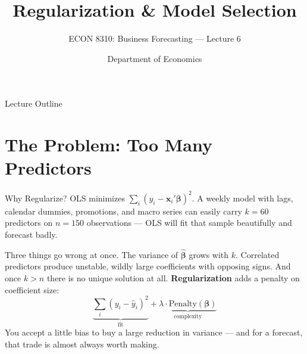 \documentclass[aspectratio=169, 11pt]{beamer}
\title[Regularization \& Model Selection]{Regularization \& Model Selection}
\subtitle{ECON 8310: Business Forecasting --- Lecture 6}
\author{Department of Economics}
\institute{University of Nebraska at Omaha}
\begin{document}

\begin{frame}
  \titlepage
\end{frame}

\begin{frame}{Lecture Outline}
  \tableofcontents
\end{frame}

\section{The Problem: Too Many Predictors}


\begin{frame}{Why Regularize?}
  OLS minimizes $\sum_{i}(y_i - \mathbf{x}_i'\boldsymbol{\beta})^2$. A weekly model with lags,
  calendar dummies, promotions, and macro series can easily carry $k = 60$ predictors on
  $n = 150$ observations --- OLS will fit that sample beautifully and forecast badly.

  \vspace{0.15cm}
  Three things go wrong at once. The variance of $\hat{\boldsymbol{\beta}}$ grows with $k$.
  Correlated predictors produce unstable, wildly large coefficients with opposing signs. And
  once $k > n$ there is no unique solution at all.
  \textbf{Regularization} adds a penalty on coefficient size:
  \[
    \underbrace{\textstyle\sum_i (y_i - \hat{y}_i)^2}_{\text{fit}}
    + \underbrace{\lambda \cdot \text{Penalty}(\boldsymbol{\beta})}_{\text{complexity}}
  \]
  \vspace{-0.2cm}
  You accept a little bias to buy a large reduction in variance --- and for a forecast, that
  trade is almost always worth making.
\end{frame}
\end{document}
